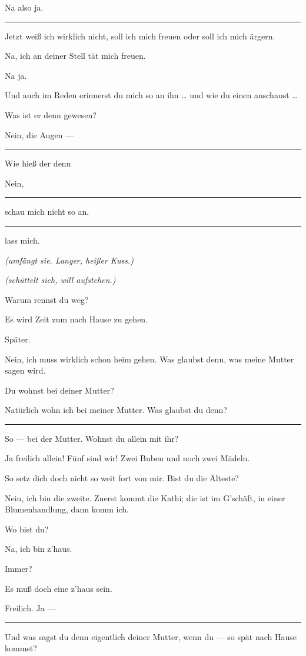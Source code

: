 \documentclass[
	final,
	a4paper,
	ngerman,
	mpinclude = true, %
	twoside = true,
	open = right,
	cleardoublepage = plain,
	DIV = 13,
	BCOR = 1cm,
	titlepage = firstiscover,
	]{scrbook}
\newcommand{\direction}[1]{\textit{(#1)}}
\newenvironment{deletion}{%
		\vspace{0.25\baselineskip}
		\hrule
		\vspace{0.25\baselineskip}
		\color{darkgray}
	}{
		\color{black}
		\vspace{0.25\baselineskip}
		\hrule 
		\vspace{0.25\baselineskip}
	}
\newcommand{\thecharacter}[1]{\textup{\textsc{#1}}\xspace}
\newcommand{\thegatte}{\thecharacter{Christian}}
\newcommand{\thesuesse}{\thecharacter{Lola}}
\newcommand{\character}[1]{\item[#1:]}
\newcommand{\gatte}{\character{\thegatte}}
\newcommand{\suesse}{\character{\thesuesse}}
\begin{document}
\begin{play}
	\suesse
	Na also ja.

	\begin{deletion}
	\gatte
	Jetzt weiß ich wirklich nicht, soll ich mich freuen oder soll ich mich ärgern.

	\suesse
	Na, ich an deiner Stell tät mich freuen.

	\gatte
	Na ja.

	\suesse
	Und auch im Reden erinnerst du mich so an ihn \ldots{} und wie du einen anschaust \ldots{}

	\gatte
	Was ist er denn gewesen?

	\suesse
	Nein, die Augen ---
	\end{deletion}

	\gatte
	Wie hieß der denn

	\suesse
	Nein,
	\begin{deletion}
		schau mich nicht so an,
	\end{deletion}
	lass mich.

	\gatte
	\direction{umfängt sie. Langer, heißer Kuss.}

	\suesse
	\direction{schüttelt sich, will aufstehen.}

	\gatte
	Warum rennst du weg?

	\suesse
	Es wird Zeit zum nach Hause zu gehen.

	\gatte
	Später.

	\suesse
	Nein, ich muss wirklich schon heim gehen. Was glaubst denn, was meine Mutter sagen wird.

	\gatte
	Du wohnst bei deiner Mutter?

	\suesse
	Natürlich wohn ich bei meiner Mutter. Was glaubst du denn?

	\begin{deletion}
	\gatte
	So --- bei der Mutter. Wohnst du allein mit ihr?

	\suesse
	Ja freilich allein! Fünf sind wir! Zwei Buben und noch zwei Mädeln.

	\gatte
	So setz dich doch nicht so weit fort von mir. Bist du die Älteste?

	\suesse
	Nein, ich bin die zweite. Zuerst kommt die Kathi; die ist im G'schäft, in einer Blumenhandlung, dann komm ich.

	\gatte
	Wo bist du?

	\suesse
	Na, ich bin z'haus.

	\gatte
	Immer?

	\suesse
	Es muß doch eine z'haus sein.

	\gatte
	Freilich. Ja ---
	\end{deletion}
	\gatte Und was sagst du denn eigentlich deiner Mutter, wenn du --- so spät nach Hause kommst?


\end{play}
\end{document}
